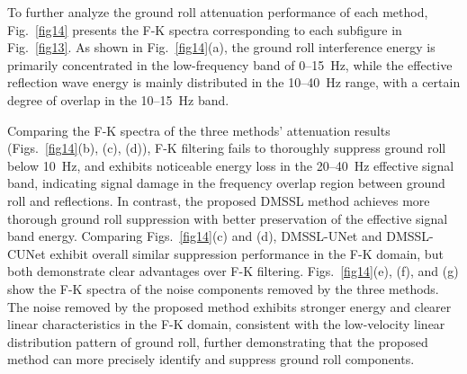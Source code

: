 \documentclass[a4paper,fleqn]{cas-dc}
\begin{document}
To further analyze the ground roll attenuation performance of each method, 
Fig.~\ref{fig14} presents the F-K spectra corresponding to each subfigure in 
Fig.~\ref{fig13}. As shown in Fig.~\ref{fig14}(a), the ground roll 
interference energy is primarily concentrated in the low-frequency band of 0--15~Hz, while 
the effective reflection wave energy is mainly distributed in the 10--40~Hz range, with a 
certain degree of overlap in the 10--15~Hz band.

Comparing the F-K spectra of the three methods' attenuation results 
(Figs.~\ref{fig14}(b), (c), (d)), F-K filtering fails to thoroughly suppress ground 
roll below 10~Hz, and exhibits noticeable energy loss in the 20--40~Hz effective signal 
band, indicating signal damage in the frequency overlap region between ground roll and 
reflections. In contrast, the proposed DMSSL method achieves more thorough ground roll 
suppression with better preservation of the effective signal band energy. Comparing 
Figs.~\ref{fig14}(c) and (d), DMSSL-UNet and DMSSL-CUNet exhibit overall similar 
suppression performance in the F-K domain, but both demonstrate clear advantages over F-K 
filtering. Figs.~\ref{fig14}(e), (f), and (g) show the F-K spectra of the noise 
components removed by the three methods. The noise removed by the proposed method exhibits 
stronger energy and clearer linear characteristics in the F-K domain, consistent with the 
low-velocity linear distribution pattern of ground roll, further demonstrating that the 
proposed method can more precisely identify and suppress ground roll components.
\end{document}

